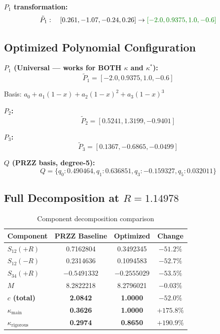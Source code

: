 \documentclass[11pt]{article}
\begin{document}
\textbf{$P_1$ transformation:}
\begin{equation}
\tilde{P}_1: \quad [0.261, -1.07, -0.24, 0.26] \to \textcolor{improvement}{[-2.0, 0.9375, 1.0, -0.6]}
\end{equation}

\subsection{Optimized Polynomial Configuration}

\textbf{$P_1$ (Universal --- works for BOTH $\kappa$ and $\kappa^*$):}
\begin{equation}
\boxed{\tilde{P}_1 = [-2.0, 0.9375, 1.0, -0.6]}
\end{equation}

Basis: $a_0 + a_1(1-x) + a_2(1-x)^2 + a_3(1-x)^3$

\textbf{$P_2$:}
\begin{equation}
\tilde{P}_2 = [0.5241, 1.3199, -0.9401]
\end{equation}

\textbf{$P_3$:}
\begin{equation}
\tilde{P}_3 = [0.1367, -0.6865, -0.0499]
\end{equation}

\textbf{$Q$ (PRZZ basis, degree-5):}
\begin{equation}
Q = \{q_0: 0.490464, q_1: 0.636851, q_3: -0.159327, q_5: 0.032011\}
\end{equation}

\subsection{Full Decomposition at $R = 1.14978$}

\begin{table}[h]
\centering
\caption{Component decomposition comparison}
\begin{tabular}{lccc}
\toprule
Component & PRZZ Baseline & Optimized & Change \\
\midrule
$S_{12}(+R)$ & 0.7162804 & 0.3492345 & $-51.2\%$ \\
$S_{12}(-R)$ & 0.2314636 & 0.1094583 & $-52.7\%$ \\
$S_{34}(+R)$ & $-0.5491332$ & $-0.2555029$ & $-53.5\%$ \\
$M$ & 8.2822218 & 8.2796021 & $-0.03\%$ \\
\midrule
\textbf{$c$ (total)} & \textbf{2.0842} & \textbf{1.0000} & \textbf{$-52.0\%$} \\
\textbf{$\kappa_{\text{main}}$} & \textbf{0.3626} & \textbf{1.0000} & \textbf{$+175.8\%$} \\
\textbf{$\kappa_{\text{rigorous}}$} & \textbf{0.2974} & \textbf{0.8650} & \textbf{$+190.9\%$} \\
\bottomrule
\end{tabular}
\end{table}
\end{document}
